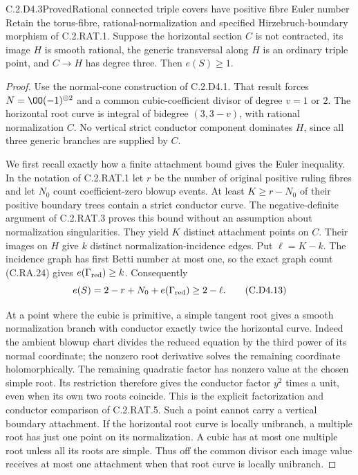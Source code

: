\begin{statement}{C.2.D4.3}{Proved}{Rational connected triple covers have positive fibre Euler number}
Retain the torus-fibre, rational-normalization and specified
Hirzebruch-boundary morphism of C.2.RAT.1. Suppose the horizontal
section $C$ is not contracted, its image $H$ is smooth rational,
the generic transversal along $H$ is an ordinary triple point,
and $C\to H$ has degree three. Then $e(S)\ge1$.
\end{statement}
\begin{proof}
Use the normal-cone construction of C.2.D4.1. That result forces
$N=\OO(-1)^{\oplus2}$ and a common cubic-coefficient divisor
of degree $v=1$ or $2$. The horizontal root curve is integral
of bidegree $(3,3-v)$, with rational normalization $C$.
No vertical strict conductor component dominates $H$, since
all three generic branches are supplied by $C$.

We first recall exactly how a finite attachment bound gives
the Euler inequality. In the notation of C.2.RAT.1 let $r$
be the number of original positive ruling fibres and let
$N_0$ count coefficient-zero blowup events. At least
$K\ge r-N_0$ of their positive boundary trees contain a
strict conductor curve. The negative-definite argument of
C.2.RAT.3 proves this bound without an assumption about
normalization singularities. They yield $K$ distinct
attachment points on $C$. Their images on $H$ give $k$
distinct normalization-incidence edges. Put $\ell=K-k$.
The incidence graph has first Betti number at most one,
so the exact graph count (C.RA.24) gives
$e(\Gamma_{\rm red})\ge k$. Consequently
\[
             e(S)=2-r+N_0+e(\Gamma_{\rm red})\ge2-\ell.
\tag{C.D4.13}
\]

At a point where the cubic is primitive, a simple tangent
root gives a smooth normalization branch with conductor
exactly twice the horizontal curve. Indeed the ambient
blowup chart divides the reduced equation by the third
power of its normal coordinate; the nonzero root derivative
solves the remaining coordinate holomorphically. The
remaining quadratic factor has nonzero value at the chosen
simple root. Its restriction therefore gives the conductor
factor $y^2$ times a unit, even when its own two roots coincide. This is the explicit
factorization and conductor comparison of C.2.RAT.5.
Such a point cannot carry a vertical boundary attachment.
If the horizontal root curve is locally unibranch, a
multiple root has just one point on its normalization.
A cubic has at most one multiple root unless all its roots
are simple. Thus off the common divisor each image value
receives at most one attachment when that root curve is
locally unibranch.


\end{proof}
